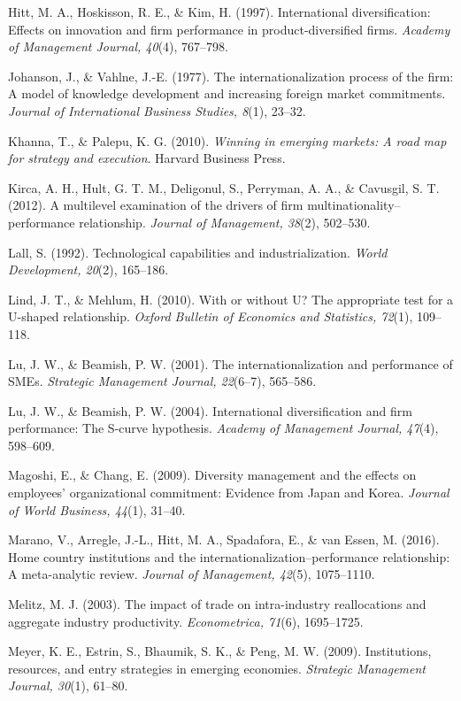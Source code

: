 \documentclass[
  12pt,a4paper]{article}
\begin{document}
Hitt, M. A., Hoskisson, R. E., \& Kim, H. (1997). International
diversification: Effects on innovation and firm performance in
product-diversified firms. \emph{Academy of Management Journal, 40}(4),
767--798.

Johanson, J., \& Vahlne, J.-E. (1977). The internationalization process
of the firm: A model of knowledge development and increasing foreign
market commitments. \emph{Journal of International Business Studies,
8}(1), 23--32.

Khanna, T., \& Palepu, K. G. (2010). \emph{Winning in emerging markets:
A road map for strategy and execution}. Harvard Business Press.

Kirca, A. H., Hult, G. T. M., Deligonul, S., Perryman, A. A., \&
Cavusgil, S. T. (2012). A multilevel examination of the drivers of firm
multinationality--performance relationship. \emph{Journal of Management,
38}(2), 502--530.

Lall, S. (1992). Technological capabilities and industrialization.
\emph{World Development, 20}(2), 165--186.

Lind, J. T., \& Mehlum, H. (2010). With or without U? The appropriate
test for a U-shaped relationship. \emph{Oxford Bulletin of Economics and
Statistics, 72}(1), 109--118.

Lu, J. W., \& Beamish, P. W. (2001). The internationalization and
performance of SMEs. \emph{Strategic Management Journal, 22}(6--7),
565--586.

Lu, J. W., \& Beamish, P. W. (2004). International diversification and
firm performance: The S-curve hypothesis. \emph{Academy of Management
Journal, 47}(4), 598--609.

Magoshi, E., \& Chang, E. (2009). Diversity management and the effects
on employees' organizational commitment: Evidence from Japan and Korea.
\emph{Journal of World Business, 44}(1), 31--40.

Marano, V., Arregle, J.-L., Hitt, M. A., Spadafora, E., \& van Essen, M.
(2016). Home country institutions and the
internationalization--performance relationship: A meta-analytic review.
\emph{Journal of Management, 42}(5), 1075--1110.

Melitz, M. J. (2003). The impact of trade on intra-industry
reallocations and aggregate industry productivity. \emph{Econometrica,
71}(6), 1695--1725.

Meyer, K. E., Estrin, S., Bhaumik, S. K., \& Peng, M. W. (2009).
Institutions, resources, and entry strategies in emerging economies.
\emph{Strategic Management Journal, 30}(1), 61--80.
\end{document}
